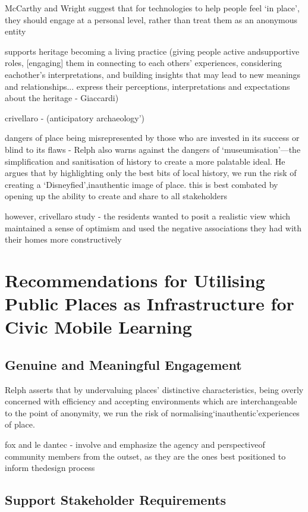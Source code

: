 McCarthy and Wright suggest that for technologies to help people feel ‘in place’, they should engage at a personal level, rather than treat them as an anonymous entity

supports heritage becoming a living practice (giving people active andsupportive roles, [engaging] them in connecting to each others’ experiences, considering eachother’s interpretations, and building insights that may lead to new meanings and relationships... express their perceptions, interpretations and expectations about the heritage - Giaccardi)

crivellaro - (anticipatory archaeology’)

dangers of place being misrepresented by those who are invested in its success or blind to its flaws -  Relph also warns against the dangers of ‘museumisation’—the simplification and sanitisation of history to create a more palatable ideal.  He argues that by highlighting only the best bits of local history, we run the risk of creating a ‘Disneyfied’,inauthentic image of place.
this is best combated by opening up the ability to create and share to all stakeholders

however, crivellaro study - the residents wanted to posit a realistic view which maintained a sense of optimism and used the negative associations they had with their homes more constructively

\section{Recommendations for Utilising Public Places as Infrastructure for Civic Mobile Learning}

\subsection{Genuine and Meaningful Engagement}

Relph asserts that by undervaluing places’ distinctive characteristics, being overly concerned with efficiency and accepting environments which are interchangeable to the point of anonymity, we run the risk of normalising‘inauthentic’experiences of place.

fox and le dantec - involve and emphasize the agency and perspectiveof community members from the outset, as they are the ones best positioned to inform thedesign process

\subsection{Support Stakeholder Requirements}


